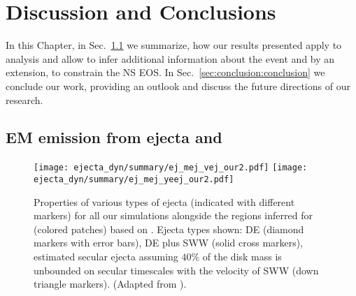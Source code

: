 \chapter{Discussion and Conclusions}\label{ch:conclusion} %



In this Chapter, in Sec.~\ref{sec:conclusion:summary} we summarize, 
how our results presented apply to \GW{} analysis and allow to 
infer additional information about the event and by 
an extension, to constrain the \ac{NS} \ac{EOS}. 
%
In Sec.~\ref{sec:conclusion:conclusion} we conclude our 
work, providing an outlook and discuss the future directions 
of our research. 


\section{\ac{EM} emission from ejecta and \AT{}}\label{sec:conclusion:summary}


\begin{figure*}[t]
    \centering 
    \texttt{[image: ejecta\_dyn/summary/ej\_mej\_vej\_our2.pdf]}
    \texttt{[image: ejecta\_dyn/summary/ej\_mej\_yeej\_our2.pdf]}
    \caption{
        Properties of various types of ejecta (indicated with different markers) 
        for all our simulations alongside the regions inferred for \AT{} 
        (colored patches) based on \citet{Siegel:2019mlp}. 
        Ejecta types shown: \ac{DE} (diamond markers with error bars), 
        \ac{DE} plus \ac{SWW} (solid cross markers), 
        estimated secular ejecta assuming $40\%$ of the disk mass 
        is unbounded on secular timescales with the velocity of \ac{SWW} 
        (down triangle markers).
        (Adapted from \citet{Nedora:2020pak}).
%        
    }
    \label{fig:ejecta:dyn:ds_sww}
\end{figure*}

